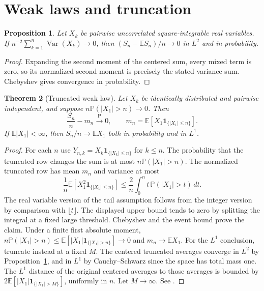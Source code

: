 \documentclass[11pt,oneside,openany]{book}
\newcommand{\Prob}{\mathbb{P}}
\newcommand{\E}{\mathbb{E}}
\DeclareMathOperator{\Var}{Var}
\newcommand{\ind}{\mathbf{1}}
\newcommand{\pto}{\xrightarrow{\mathrm{P}}}
\theoremstyle{plain}
\newtheorem{theorem}{Theorem}[chapter]
\newtheorem{proposition}[theorem]{Proposition}
\theoremstyle{definition}
\theoremstyle{remark}
\begin{document}
\section{Weak laws and truncation}
\label{p08-01}

\begin{proposition}\label{prop:weak-var}
Let \(X_k\) be pairwise uncorrelated square-integrable real variables.
If \(n^{-2}\sum_{k=1}^n\Var(X_k)\to0\), then
\((S_n-\E S_n)/n\to0\) in \(L^2\) and in probability.
\end{proposition}
\begin{proof}
Expanding the second moment of the centered sum, every mixed term is
zero, so its normalized second moment is precisely the stated
variance sum. Chebyshev gives convergence in probability.
\end{proof}

\begin{theorem}[Truncated weak law]\label{thm:truncated-wlln}
Let \(X_k\) be identically distributed and pairwise independent, and
suppose \(n\Prob(|X_1|>n)\to0\). Then
\[
 \frac{S_n}{n}-m_n\pto0,\qquad
 m_n=\E[X_1\ind_{\{|X_1|\le n\}}].
\]
If \(\E|X_1|<\infty\), then \(S_n/n\to \E X_1\) both in probability
and in \(L^1\).
\end{theorem}

\begin{proof}
For each \(n\) use \(Y_{n,k}=X_k\ind_{\{|X_k|\le n\}}\) for \(k\le n\).
The probability that the truncated row changes the sum is at most
\(n\Prob(|X_1|>n)\). The normalized truncated row has mean \(m_n\)
and variance at most
\[
 \frac1n \E[X_1^2\ind_{\{|X_1|\le n\}}]
 \le \frac2n\int_0^n t\,\Prob(|X_1|>t)\,dt .
\]
The real variable version of the tail assumption follows from the
integer version by comparison with \(\lfloor t\rfloor\).
The displayed upper bound tends to zero by splitting the integral at
a fixed large threshold. Chebyshev and the event bound prove the claim.
Under a finite first absolute moment,
\(n\Prob(|X_1|>n)\le \E[|X_1|\ind_{\{|X_1|>n\}}]\to0\) and
\(m_n\to\E X_1\). For the \(L^1\) conclusion, truncate instead at a
fixed \(M\). The centered truncated averages converge in \(L^2\)
by Proposition~\ref{prop:weak-var}, and in \(L^1\) by Cauchy--Schwarz
since the space has total mass one. The \(L^1\) distance of the original
centered averages to those averages is bounded by
\(2\E[|X_1|\ind_{\{|X_1|>M\}}]\), uniformly in \(n\).
Let \(M\to\infty\). See \cite[results 2.2.11--2.2.14]{Durrett}.
\end{proof}
\end{document}
